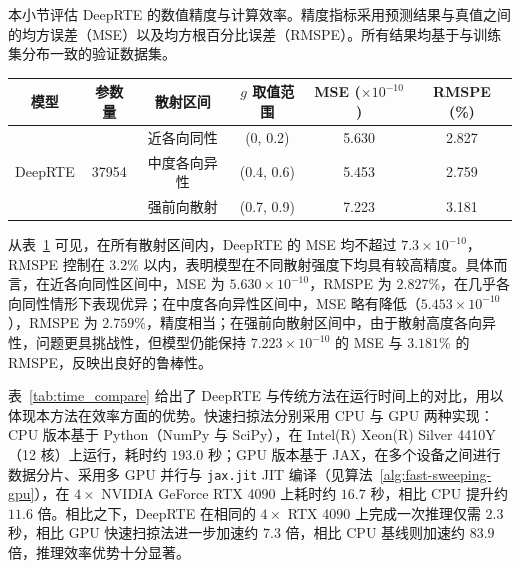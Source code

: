 本小节评估 DeepRTE 的数值精度与计算效率。精度指标采用预测结果与真值之间的均方误差（MSE）以及均方根百分比误差（RMSPE）。所有结果均基于与训练集分布一致的验证数据集。

\begin{table}[!htp]
    \centering
    \begin{tabular}{@{}cccccc@{}}
        \toprule
        模型                       & 参数量                    & 散射区间   & $g$ 取值范围   & MSE ($\times 10^{-10}$) & RMSPE (\%) \\ \midrule
        \multirow{3}{*}{DeepRTE} & \multirow{3}{*}{37954} & 近各向同性  & (0, 0.2)   & 5.630                   & 2.827      \\ \cmidrule(l){3-6}
                                 &                        & 中度各向异性 & (0.4, 0.6) & 5.453                   & 2.759      \\ \cmidrule(l){3-6}
                                 &                        & 强前向散射  & (0.7, 0.9) & 7.223                   & 3.181      \\ \bottomrule
    \end{tabular}
    \label{tab:accuracy}
\end{table}

从表~\ref{tab:accuracy} 可见，在所有散射区间内，DeepRTE 的 MSE 均不超过 $7.3 \times 10^{-10}$，RMSPE 控制在 $3.2\%$ 以内，表明模型在不同散射强度下均具有较高精度。具体而言，在近各向同性区间中，MSE 为 $5.630 \times 10^{-10}$，RMSPE 为 $2.827\%$，在几乎各向同性情形下表现优异；在中度各向异性区间中，MSE 略有降低（$5.453 \times 10^{-10}$），RMSPE 为 $2.759\%$，精度相当；在强前向散射区间中，由于散射高度各向异性，问题更具挑战性，但模型仍能保持 $7.223 \times 10^{-10}$ 的 MSE 与 $3.181\%$ 的 RMSPE，反映出良好的鲁棒性。

表~\ref{tab:time_compare} 给出了 DeepRTE 与传统方法在运行时间上的对比，用以体现本方法在效率方面的优势。快速扫掠法分别采用 CPU 与 GPU 两种实现：CPU 版本基于 Python（NumPy 与 SciPy），在 Intel(R) Xeon(R) Silver 4410Y（12 核）上运行，耗时约 $193.0$ 秒；GPU 版本基于 JAX，在多个设备之间进行数据分片、采用多 GPU 并行与 \texttt{jax.jit} JIT 编译（见算法~\ref{alg:fast-sweeping-gpu}），在 $4\times$ NVIDIA GeForce RTX 4090 上耗时约 $16.7$ 秒，相比 CPU 提升约 $11.6$ 倍。相比之下，DeepRTE 在相同的 $4\times$ RTX 4090 上完成一次推理仅需 $2.3$ 秒，相比 GPU 快速扫掠法进一步加速约 $7.3$ 倍，相比 CPU 基线则加速约 $83.9$ 倍，推理效率优势十分显著。

